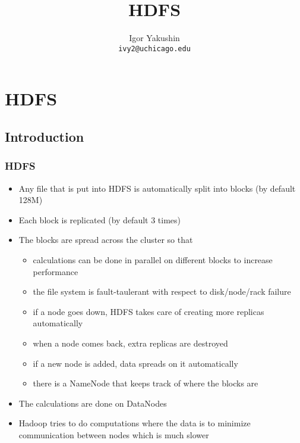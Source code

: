 \documentclass{beamer}
\title{\huge{HDFS}}
\author{Igor Yakushin \\ \texttt{ivy2@uchicago.edu}}
\begin{document}



\begin{frame}
\titlepage
\end{frame}




\section{HDFS}
\subsection{Introduction}
\begin{frame}
 \frametitle{HDFS}
    \begin{itemize}
     \item Any file that is put into HDFS is automatically split into blocks (by default 128M)
     \item Each block is replicated (by default 3 times)
     \item The blocks are spread across the cluster so that
      \begin{itemize}
	\item calculations can be done in parallel on different blocks to increase performance
	\item the file system is fault-taulerant with respect to disk/node/rack failure
	\item if a node goes down, HDFS takes care of creating more replicas automatically
	\item when a node comes back, extra replicas are destroyed
	\item if a new node is added, data spreads on it automatically
	\item there is a {\color{mycolordef}NameNode} that keeps track of where the blocks are
      \end{itemize}
	\item The calculations are done on {\color{mycolordef}DataNodes}
        \item Hadoop tries to do computations where the data is to minimize communication between nodes which is much slower
    \end{itemize} 
\end{frame}
\end{document}
